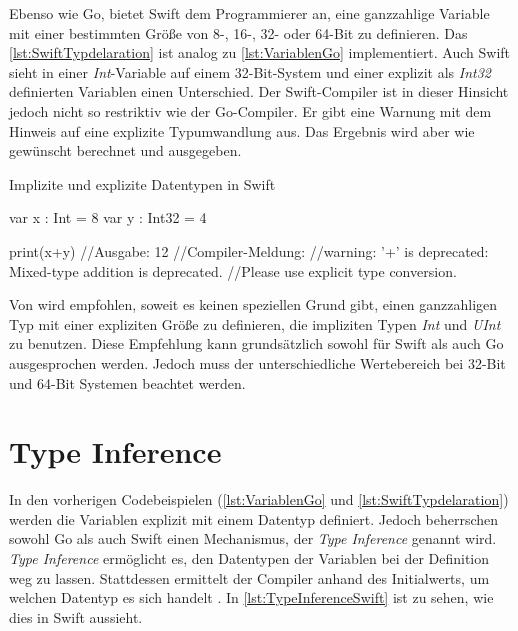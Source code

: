 Ebenso wie Go, bietet Swift dem Programmierer an, eine ganzzahlige Variable mit einer bestimmten Größe von 8-, 16-, 32- oder 64-Bit zu definieren.
Das \autoref{lst:SwiftTypdelaration} ist analog zu \autoref{lst:VariablenGo} implementiert.
Auch Swift sieht in einer \emph{Int}-Variable auf einem 32-Bit-System und einer explizit als \emph{Int32} definierten Variablen einen Unterschied.
Der Swift-Compiler ist in dieser Hinsicht jedoch nicht so restriktiv wie der Go-Compiler.
Er gibt eine Warnung mit dem Hinweis auf eine explizite Typumwandlung aus.
Das Ergebnis wird aber wie gewünscht berechnet und ausgegeben. 

\begin{listing}[H]
\caption{Implizite und explizite Datentypen in Swift}
\label{lst:SwiftTypdelaration}
\begin{SwiftCode}
var x : Int = 8
var y : Int32 = 4

print(x+y) //Ausgabe: 12
//Compiler-Meldung: 
//warning: '+' is deprecated: Mixed-type addition is deprecated. 
//Please use explicit type conversion.
\end{SwiftCode}
\end{listing}

Von \cite[S.30]{Hoffman.2017} wird empfohlen, soweit es keinen speziellen Grund gibt, einen ganzzahligen Typ mit einer expliziten Größe zu definieren, die impliziten Typen \emph{Int} und \emph{UInt} zu benutzen.
Diese Empfehlung kann grundsätzlich sowohl für Swift als auch Go ausgesprochen werden.
Jedoch muss der unterschiedliche Wertebereich bei 32-Bit und 64-Bit Systemen beachtet werden. 

\section{Type Inference}
\label{sec:TypeInference}
In den vorherigen Codebeispielen (\ref{lst:VariablenGo} und \ref{lst:SwiftTypdelaration}) werden die Variablen explizit mit einem Datentyp definiert. Jedoch beherrschen sowohl Go als auch Swift einen Mechanismus, der \emph{Type Inference} genannt wird. 
\emph{Type Inference} ermöglicht es, den Datentypen der Variablen bei der Definition weg zu lassen. 
Stattdessen ermittelt der Compiler anhand des Initialwerts, um welchen Datentyp es sich handelt \cite[S.28]{Hoffman.2017}.
In \autoref{lst:TypeInferenceSwift} ist zu sehen, wie dies in Swift aussieht.

